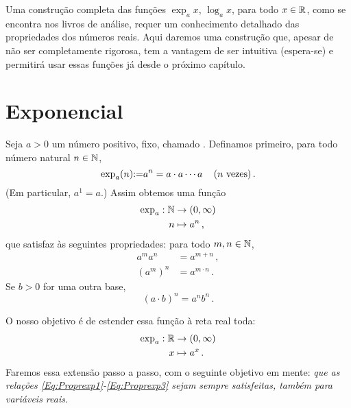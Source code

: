 Uma construção completa das funções $\exp_ax$, $\log_a x$, para todo $x\in \mathbb{R}$,
como se encontra nos livros de análise, requer um conhecimento detalhado das
propriedades dos números reais. Aqui daremos uma construção que, apesar de não
ser completamente rigorosa, tem a vantagem de ser intuitiva (espera-se) e permitirá
usar essas funções já desde o próximo capítulo.

\section{Exponencial}\label{Sec:Exponencial}

Seja $a>0$ um número positivo, fixo, chamado . Definamos primeiro,
para todo número natural $n\in\mathbb{N}$,
$$\exp_a(n){:=} a^n= a\cdot a\cdots a\,\quad \text{($n$ vezes)}\,.$$
(Em particular, $a^1=a$.)
Assim obtemos uma função
\begin{align*}
 \exp_a:\mathbb{N}&\to (0,\infty)\\
n&\mapsto a^n\,,
\end{align*}
que satisfaz às seguintes propriedades: para todo $m,n\in\mathbb{N}$,
\begin{align}
a^ma^n&=a^{m+n}\,,\label{Eq:Proprexp1}\\
(a^m)^n&=a^{m\cdot n}\,.\label{Eq:Proprexp2}
\end{align}
Se $b>0$ for uma outra base,
\begin{equation}
(a\cdot b)^n=a^nb^n\,.\label{Eq:Proprexp3}
\end{equation}

O nosso objetivo é de estender essa função à reta real toda:
\begin{align*}
 \exp_a:\mathbb{R}&\to (0,\infty)\\
x&\mapsto a^x\,.
\end{align*}
Faremos essa extensão passo a passo, com o seguinte objetivo em mente: \emph{que
as relações \eqref{Eq:Proprexp1}-\eqref{Eq:Proprexp3} sejam sempre satisfeitas,
também para variáveis reais.}\\

